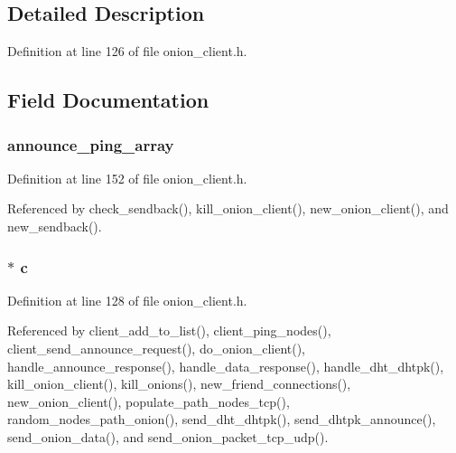 \subsection{Detailed Description}


Definition at line 126 of file onion\+\_\+client.\+h.



\subsection{Field Documentation}
\hypertarget{struct_onion___client_a01eafc8a6b041139be5bc6d72c2eafdf}{
\subsubsection[{announce\+\_\+ping\+\_\+array}]{ announce\+\_\+ping\+\_\+array}}\label{struct_onion___client_a01eafc8a6b041139be5bc6d72c2eafdf}


Definition at line 152 of file onion\+\_\+client.\+h.



Referenced by check\+\_\+sendback(), kill\+\_\+onion\+\_\+client(), new\+\_\+onion\+\_\+client(), and new\+\_\+sendback().

\hypertarget{struct_onion___client_a0f5b9349eb586149cef9017eed2abdfe}{
\subsubsection[{c}]{$\ast$ c}}\label{struct_onion___client_a0f5b9349eb586149cef9017eed2abdfe}


Definition at line 128 of file onion\+\_\+client.\+h.



Referenced by client\+\_\+add\+\_\+to\+\_\+list(), client\+\_\+ping\+\_\+nodes(), client\+\_\+send\+\_\+announce\+\_\+request(), do\+\_\+onion\+\_\+client(), handle\+\_\+announce\+\_\+response(), handle\+\_\+data\+\_\+response(), handle\+\_\+dht\+\_\+dhtpk(), kill\+\_\+onion\+\_\+client(), kill\+\_\+onions(), new\+\_\+friend\+\_\+connections(), new\+\_\+onion\+\_\+client(), populate\+\_\+path\+\_\+nodes\+\_\+tcp(), random\+\_\+nodes\+\_\+path\+\_\+onion(), send\+\_\+dht\+\_\+dhtpk(), send\+\_\+dhtpk\+\_\+announce(), send\+\_\+onion\+\_\+data(), and send\+\_\+onion\+\_\+packet\+\_\+tcp\+\_\+udp().

